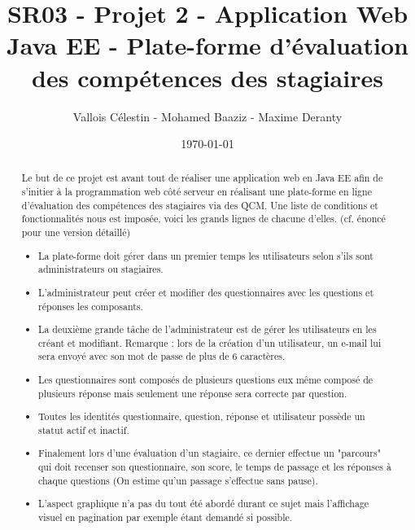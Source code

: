 \documentclass[a4paper]{article}
\title{SR03 - Projet 2 - Application Web Java EE - Plate-forme d'évaluation des compétences des stagiaires}
\author{Vallois Célestin - Mohamed Baaziz - Maxime Deranty}
\date{\today}
\begin{document}
\maketitle

\begin{abstract}

Le but de ce projet est avant tout de réaliser une application web en Java EE afin de s'initier à la programmation web côté serveur en réalisant une plate-forme en ligne d'évaluation des compétences des stagiaires via des QCM. Une liste de conditions et fonctionnalités nous est imposée, voici les grands lignes de chacune d'elles. (cf. énoncé pour une version détaillé)

\begin{itemize}

\item La plate-forme doit gérer dans un premier temps les utilisateurs selon s'ils sont administrateurs ou stagiaires.

\item L'administrateur peut créer et modifier des questionnaires avec les questions et réponses les composants.

\item La deuxième grande tâche de l'administrateur est de gérer les utilisateurs en les créant et modifiant. Remarque : lors de la création d'un utilisateur, un e-mail lui sera envoyé avec son mot de passe de plus de 6 caractères.

\item Les questionnaires sont composés de plusieurs questions eux même composé de plusieurs réponse mais seulement une réponse sera correcte par question.

\item Toutes les identités questionnaire, question, réponse et utilisateur possède un statut actif et inactif.

\item Finalement lors d'une évaluation d'un stagiaire, ce dernier effectue un "parcours" qui doit recenser son questionnaire, son score, le temps de passage et les réponses à chaque questions (On estime qu'un passage s'effectue sans pause).

\item L'aspect graphique n'a pas du tout été abordé durant ce sujet mais l'affichage visuel en pagination par exemple étant demandé si possible.

\end{itemize}

\end{abstract}
\end{document}
